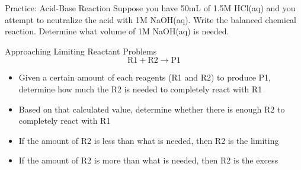 \documentclass[11pt]{beamer}
\begin{document}
\begin{frame}{Practice: Acid-Base Reaction}
  Suppose you have 50mL of 1.5M HCl(aq) and you attempt to neutralize the
  acid with 1M NaOH(aq). Write the balanced chemical reaction. Determine
  what volume of 1M NaOH(aq) is needed.
  \vspace{1.2in}
\end{frame}

\begin{frame}{Approaching Limiting Reactant Problems}
  \begin{equation}
    \text{R1} + \text{R2} \rightarrow \text{P1}
  \end{equation}
  \begin{itemize}
  \item Given a certain amount of each reagents (R1 and R2)
    to produce P1, determine
    how much the R2 is needed to completely react with R1
  \item Based on that calculated value, determine whether
    there is enough R2 to completely react with R1
  \item If the amount of R2 is less than what is needed,
    then R2 is the limiting
  \item If the amount of R2 is more than what is needed,
    then R2 is the excess
  \end{itemize}
\end{frame}
\end{document}
